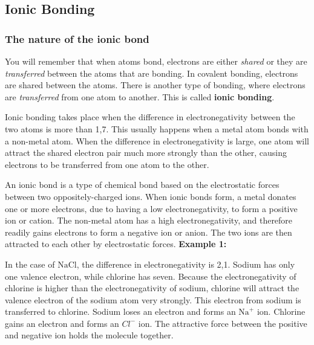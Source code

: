             \subsection{ Ionic Bonding}
            \nopagebreak
      \label{m38684*uid54}
            \subsubsection{ The nature of the ionic bond}
            \nopagebreak
        \label{m38684*id142190}You will remember that when atoms bond, electrons are either \textsl{shared} or they are \textsl{transferred} between the atoms that are bonding. In covalent bonding, electrons are shared between the atoms. There is another type of bonding, where electrons are \textsl{transferred} from one atom to another. This is called \textbf{ionic bonding}.\par 
        \label{m38684*id142218}Ionic bonding takes place when the difference in electronegativity between the two atoms is more than 1,7. This usually happens when a metal atom bonds with a non-metal atom. When the difference in electronegativity is large, one atom will attract the shared electron pair much more strongly than the other, causing electrons to be transferred from one atom to the other.\par 
\label{m38684*fhsst!!!underscore!!!id456}
 { \label{m38684*meaningfhsst!!!underscore!!!id456}
        An ionic bond is a type of chemical bond based on the electrostatic forces between two oppositely-charged ions. When ionic bonds form, a metal donates one or more electrons, due to having a low electronegativity, to form a positive ion or cation. The non-metal atom has a high electronegativity, and therefore readily gains electrons to form a negative ion or anion. The two ions are then attracted to each other by electrostatic forces.
         } 
        \label{m38684*id142248}
          \textbf{Example 1:}
        \par 
        \label{m38684*id142255}In the case of $\mathrm{NaCl}$, the difference in electronegativity is 2,1. Sodium has only one valence electron, while chlorine has seven. Because the electronegativity of chlorine is higher than the electronegativity of sodium, chlorine will attract the valence electron of the sodium atom very strongly. This electron from sodium is transferred to chlorine. Sodium loses an electron and forms an ${\mathrm{Na}}^{+}$ ion. Chlorine gains an electron and forms an ${Cl}^{-}$ ion. The attractive force between the positive and negative ion holds the molecule together.\par 
